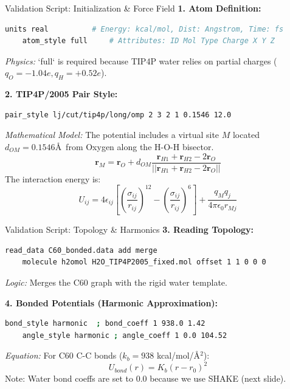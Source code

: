 \documentclass[aspectratio=169, 10pt]{beamer}
\begin{document}
\begin{frame}[fragile]{Validation Script: Initialization \& Force Field}
    \textbf{1. Atom Definition:}
    \begin{lstlisting}[language=bash]
    units real          # Energy: kcal/mol, Dist: Angstrom, Time: fs
    atom_style full     # Attributes: ID Mol Type Charge X Y Z
    \end{lstlisting}
    \textit{Physics:} `full` is required because TIP4P water relies on partial charges ($q_O = -1.04e, q_H = +0.52e$).

    \vspace{0.3cm}
    \textbf{2. TIP4P/2005 Pair Style:}
    \begin{lstlisting}[language=bash]
    pair_style lj/cut/tip4p/long/omp 2 3 2 1 0.1546 12.0
    \end{lstlisting}
    \textit{Mathematical Model:} The potential includes a virtual site $M$ located $d_{OM} = 0.1546$\AA\ from Oxygen along the H-O-H bisector.
    \begin{equation}
        \mathbf{r}_M = \mathbf{r}_O + d_{OM} \frac{\mathbf{r}_{H1} + \mathbf{r}_{H2} - 2\mathbf{r}_O}{||\mathbf{r}_{H1} + \mathbf{r}_{H2} - 2\mathbf{r}_O||}
    \end{equation}
    The interaction energy is:
    \begin{equation}
        U_{ij} = 4\epsilon_{ij} \left[ \left(\frac{\sigma_{ij}}{r_{ij}}\right)^{12} - \left(\frac{\sigma_{ij}}{r_{ij}}\right)^6 \right] + \frac{q_M q_{j}}{4\pi\epsilon_0 r_{Mj}}
    \end{equation}
\end{frame}

\begin{frame}[fragile]{Validation Script: Topology \& Harmonics}
    \textbf{3. Reading Topology:}
    \begin{lstlisting}[language=bash]
    read_data C60_bonded.data add merge
    molecule h2omol H2O_TIP4P2005_fixed.mol offset 1 1 0 0 0
    \end{lstlisting}
    \textit{Logic:} Merges the C60 graph with the rigid water template.

    \vspace{0.3cm}
    \textbf{4. Bonded Potentials (Harmonic Approximation):}
    \begin{lstlisting}[language=bash]
    bond_style harmonic  ; bond_coeff 1 938.0 1.42
    angle_style harmonic ; angle_coeff 1 0.0 104.52
    \end{lstlisting}
    \textit{Equation:} For C60 C-C bonds ($k_b = 938$ kcal/mol/\AA$^2$):
    \begin{equation}
        U_{bond}(r) = K_b (r - r_0)^2
    \end{equation}
    Note: Water bond coeffs are set to 0.0 because we use SHAKE (next slide).
\end{frame}
\end{document}
